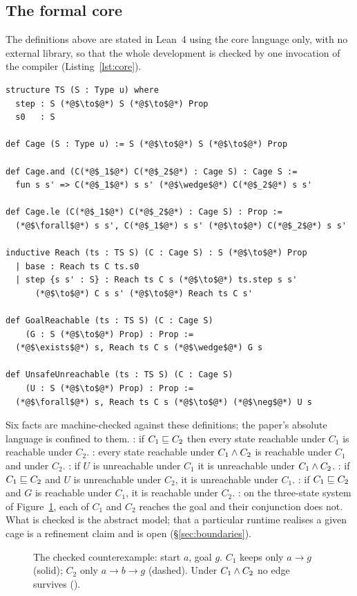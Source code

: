 \subsection{The formal core}
\label{sec:lean}

The definitions above are stated in Lean~4 using the core language only, with no external library, so that the whole development is checked by one invocation of the compiler (Listing~\ref{lst:core}).

\begin{lstlisting}[caption={Definitions in \code{formal/CagingCore.lean}.},label={lst:core},float=t]
structure TS (S : Type u) where
  step : S (*@$\to$@*) S (*@$\to$@*) Prop
  s0   : S

def Cage (S : Type u) := S (*@$\to$@*) S (*@$\to$@*) Prop

def Cage.and (C(*@$_1$@*) C(*@$_2$@*) : Cage S) : Cage S :=
  fun s s' => C(*@$_1$@*) s s' (*@$\wedge$@*) C(*@$_2$@*) s s'

def Cage.le (C(*@$_1$@*) C(*@$_2$@*) : Cage S) : Prop :=
  (*@$\forall$@*) s s', C(*@$_1$@*) s s' (*@$\to$@*) C(*@$_2$@*) s s'

inductive Reach (ts : TS S) (C : Cage S) : S (*@$\to$@*) Prop
  | base : Reach ts C ts.s0
  | step {s s' : S} : Reach ts C s (*@$\to$@*) ts.step s s'
      (*@$\to$@*) C s s' (*@$\to$@*) Reach ts C s'

def GoalReachable (ts : TS S) (C : Cage S)
    (G : S (*@$\to$@*) Prop) : Prop :=
  (*@$\exists$@*) s, Reach ts C s (*@$\wedge$@*) G s

def UnsafeUnreachable (ts : TS S) (C : Cage S)
    (U : S (*@$\to$@*) Prop) : Prop :=
  (*@$\forall$@*) s, Reach ts C s (*@$\to$@*) (*@$\neg$@*) U s
\end{lstlisting}

Six facts are machine-checked against these definitions; the paper's absolute language is confined to them. : if $C_1 \sqsubseteq C_2$ then every state reachable under $C_1$ is reachable under $C_2$. : every state reachable under $C_1 \wedge C_2$ is reachable under $C_1$ and under $C_2$. : if $U$ is unreachable under $C_1$ it is unreachable under $C_1 \wedge C_2$. : if $C_1 \sqsubseteq C_2$ and $U$ is unreachable under $C_2$, it is unreachable under $C_1$. : if $C_1 \sqsubseteq C_2$ and $G$ is reachable under $C_1$, it is reachable under $C_2$. : on the three-state system of Figure~\ref{fig:three}, each of $C_1$ and $C_2$ reaches the goal and their conjunction does not. What is checked is the abstract model; that a particular runtime realises a given cage is a refinement claim and is open (\S\ref{sec:boundaries}).

\begin{figure}[t]
\centering

\caption{The checked counterexample: start $a$, goal $g$. $C_1$ keeps only $a\to g$ (solid); $C_2$ only $a\to b\to g$ (dashed). Under $C_1 \wedge C_2$ no edge survives ().}
\label{fig:three}
\end{figure}
